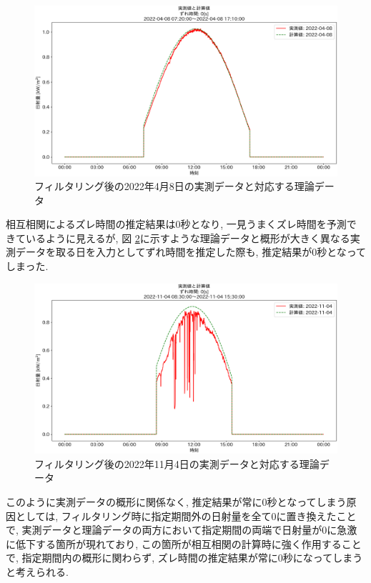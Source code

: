 \documentclass[a4j,12pt,]{jarticle}
\begin{document}
\begin{figure}[H]
  \begin{center}
    \includegraphics[width=160mm]{2022-04-08_partial_corr.png}
    \caption{フィルタリング後の2022年4月8日の実測データと対応する理論データ}
    \label{p6}
  \end{center}
\end{figure}

相互相関によるズレ時間の推定結果は0秒となり, 一見うまくズレ時間を予測できているように見えるが, 図 \ref{p7}に示すような理論データと概形が大きく異なる実測データを取る日を入力としてずれ時間を推定した際も, 推定結果が0秒となってしまった. 

\begin{figure}[H]
  \begin{center}
    \includegraphics[width=160mm]{2022-11-04_partial_corr.png}
    \caption{フィルタリング後の2022年11月4日の実測データと対応する理論データ}
    \label{p7}
  \end{center}
\end{figure}

このように実測データの概形に関係なく, 推定結果が常に0秒となってしまう原因としては, フィルタリング時に指定期間外の日射量を全て0に置き換えたことで, 実測データと理論データの両方において指定期間の両端で日射量が0に急激に低下する箇所が現れており, この箇所が相互相関の計算時に強く作用することで, 指定期間内の概形に関わらず, ズレ時間の推定結果が常に0秒になってしまうと考えられる. 
\end{document}
